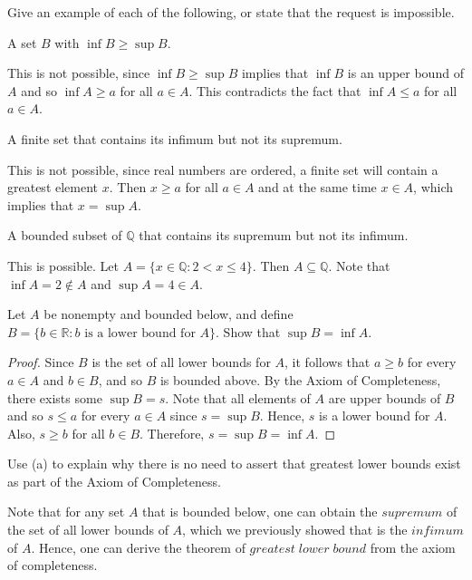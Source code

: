 \documentclass[12pt]{article}
\newcommand{\R}{\mathbb{R}}
\newcommand{\Q}{\mathbb{Q}}
\newenvironment{problem}[2][Problem]{\begin{trivlist}
		\item[\hskip \labelsep {\bfseries #1}\hskip \labelsep {\bfseries #2.}]}{\end{trivlist}}
\newenvironment{solution}[2][Solution]{\begin{trivlist}
		\item[\hskip \labelsep {\bfseries #1}\hskip \labelsep {\bfseries #2.}]}{\end{trivlist}}
\begin{document}
		\begin{problem}{1.3.2}
				Give an example of each of the following, or state that the request is impossible.
			\begin{enumerate}[label=(\alph*)]
				\item A set $B$ with $\inf B \geq \sup B$.
				\begin{solution}{(a)}
					This is not possible, since $\inf B \geq \sup B$ implies that $\inf B$ is an upper bound of $A$ and so $\inf A \geq a$ for all $a\in A$. This contradicts the fact that $\inf A \leq a$ for all $a\in A$.
				\end{solution}
				\item A finite set that contains its infimum but not its supremum.
				\begin{solution}{(b)}
					This is not possible, since real numbers are ordered, a finite set will contain a greatest element $x$. Then $x\geq a$ for all $a\in A$ and at the same time $x\in A$, which implies that $x=\sup A$.
				\end{solution}
				\item A bounded subset of $\Q$ that contains its supremum but not its infimum. 
				\begin{solution}{(c)}
					This is possible. Let $A=\{x\in \Q: 2<x\leq 4\}$. Then $A\subseteq \Q$. Note that $\inf A=2\not\in A$ and $\sup A = 4\in A$. 
				\end{solution}
			\end{enumerate}
		\end{problem}
		
		\begin{problem}{1.3.3}
			\begin{enumerate}[label=(\alph*)]
			\item Let $A$ be nonempty and bounded below, and define $B=\{b\in \R:b \text{ is a lower bound for }A\}$. Show that $\sup B = \inf A$.
			\begin{proof}
				Since $B$ is the set of all lower bounds for $A$, it follows that $a\geq b$ for every $a\in A$ and $b\in B$, and so $B$ is bounded above. By the Axiom of Completeness, there exists some $\sup B = s$. Note that all elements of $A$ are upper bounds of $B$ and so $s\leq a$ for every $a\in A$ since $s=\sup B$. Hence, $s$ is a lower bound for $A$. Also, $s\geq b$ for all $b\in B$. Therefore, $s=\sup B = \inf A$.
			\end{proof}
			\item Use (a) to explain why there is no need to assert that greatest lower bounds exist as part of the Axiom of Completeness.
			\begin{solution}{b}
				Note that for any set $A$ that is bounded below, one can obtain the $supremum$ of the set of all lower bounds of $A$, which we previously showed that is the $infimum$ of $A$. Hence, one can derive the theorem of $greatest \; lower \; bound$ from the axiom of completeness.
			\end{solution}
			
			\end{enumerate}
		\end{problem}
	
\end{document}
